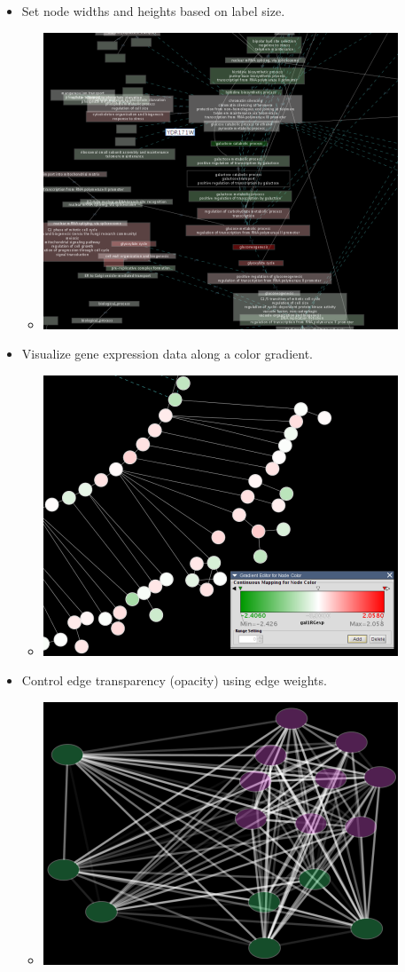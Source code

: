 \begin{itemize}
\begin{itemize}
\end{itemize}

\item Set node widths and heights based on label size. \begin{itemize}
\item 

 \includegraphics[width=.6\textwidth]{images/LabelWidthAndHeight.png} 


\end{itemize}

\item Visualize gene expression data along a color gradient. \begin{itemize}
\item 

 \includegraphics[width=.6\textwidth]{images/ColorGradient.png} 


\end{itemize}

\item Control edge transparency (opacity) using edge weights. \begin{itemize}
\item 

 \includegraphics[width=.6\textwidth]{images/OpacityForEdges.png} 



\end{itemize}
\end{itemize}
